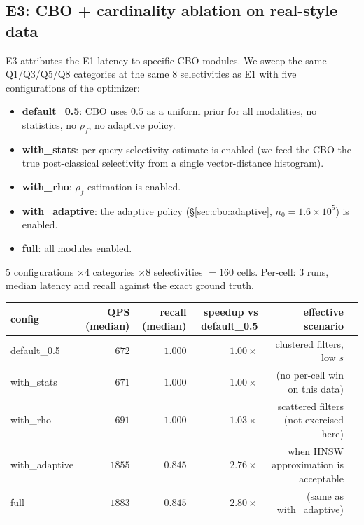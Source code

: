 \documentclass[sigconf,nonacm,review]{acmart}
\theoremstyle{plain}
\theoremstyle{definition}
\theoremstyle{remark}
\begin{document}
\subsection{E3: CBO + cardinality ablation on real-style data}\label{sec:eval:e3}

E3 attributes the E1 latency to specific CBO modules.  We
sweep the same Q1/Q3/Q5/Q8 categories at the same $8$
selectivities as E1 with five configurations of the optimizer:

\begin{itemize}[leftmargin=*, itemsep=1pt]
  \item \textbf{default\_0.5}: CBO uses $0.5$ as a uniform
    prior for all modalities, no statistics, no $\rho_f$,
    no adaptive policy.
  \item \textbf{with\_stats}: per-query selectivity estimate
    is enabled (we feed the CBO the true post-classical
    selectivity from a single vector-distance histogram).
  \item \textbf{with\_rho}: $\rho_f$ estimation is enabled.
  \item \textbf{with\_adaptive}: the adaptive policy
    (\S\ref{sec:cbo:adaptive}, $n_0 = 1.6 \times 10^5$) is
    enabled.
  \item \textbf{full}: all modules enabled.
\end{itemize}

\noindent $5$ configurations $\times 4$ categories $\times 8$
selectivities $= 160$ cells.  Per-cell: $3$ runs, median
latency and recall against the exact ground truth.

\begin{center}
\begin{tabular}{l rrrrr}
\toprule
config & QPS (median) & recall (median) & speedup vs default\_0.5 & effective scenario \\
\midrule
default\_0.5    & $672$  & $1.000$ & $1.00\times$  & clustered filters, low $s$ \\
with\_stats     & $671$  & $1.000$ & $1.00\times$  & (no per-cell win on this data) \\
with\_rho       & $691$  & $1.000$ & $1.03\times$  & scattered filters (not exercised here) \\
with\_adaptive  & $1855$ & $0.845$ & $\mathbf{2.76\times}$ & when HNSW approximation is acceptable \\
full           & $1883$ & $0.845$ & $\mathbf{2.80\times}$ & (same as with\_adaptive) \\
\bottomrule
\end{tabular}
\end{center}
\end{document}
